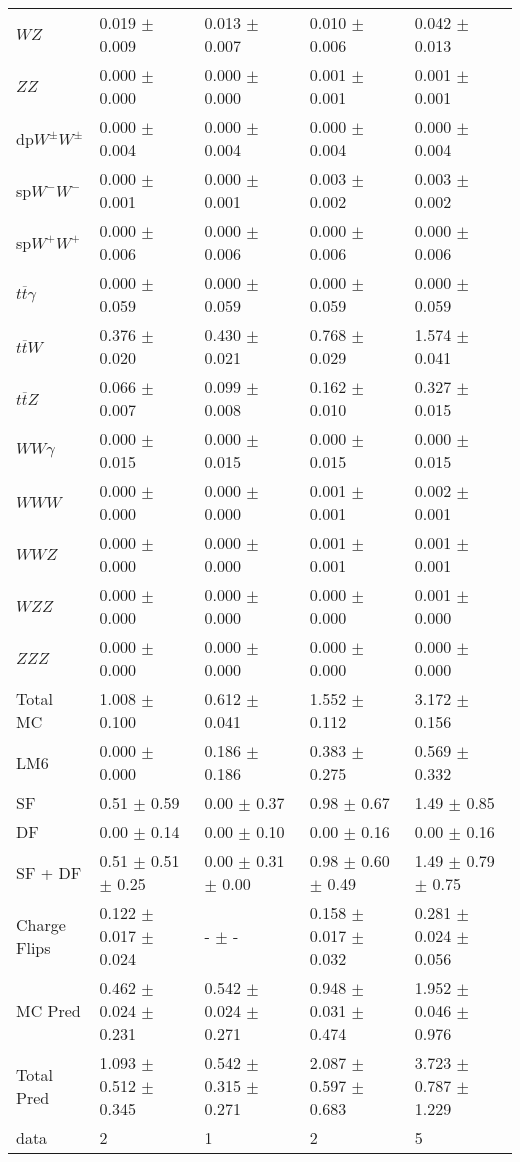 \begin{tabular}{l | l l l l}
$WZ$ &  0.019 $\pm$  0.009 &  0.013 $\pm$  0.007 &  0.010 $\pm$  0.006 &  0.042 $\pm$  0.013\\
$ZZ$ &  0.000 $\pm$   0.000 &  0.000 $\pm$   0.000 &  0.001 $\pm$  0.001 &  0.001 $\pm$  0.001\\
\hline
dp$W^{\pm}W^{\pm}$ &  0.000 $\pm$  0.004 &  0.000 $\pm$  0.004 &  0.000 $\pm$  0.004 &  0.000 $\pm$  0.004\\
sp$W^{-}W^{-}$ &  0.000 $\pm$  0.001 &  0.000 $\pm$  0.001 &  0.003 $\pm$  0.002 &  0.003 $\pm$  0.002\\
sp$W^{+}W^{+}$ &  0.000 $\pm$  0.006 &  0.000 $\pm$  0.006 &  0.000 $\pm$  0.006 &  0.000 $\pm$  0.006\\
$t\overline{t}\gamma$ &  0.000 $\pm$  0.059 &  0.000 $\pm$  0.059 &  0.000 $\pm$  0.059 &  0.000 $\pm$  0.059\\
$t\overline{t}W$ &  0.376 $\pm$  0.020 &  0.430 $\pm$  0.021 &  0.768 $\pm$  0.029 &  1.574 $\pm$  0.041\\
$t\overline{t}Z$ &  0.066 $\pm$  0.007 &  0.099 $\pm$  0.008 &  0.162 $\pm$  0.010 &  0.327 $\pm$  0.015\\
$WW\gamma$ &  0.000 $\pm$  0.015 &  0.000 $\pm$  0.015 &  0.000 $\pm$  0.015 &  0.000 $\pm$  0.015\\
$WWW$ &   0.000 $\pm$   0.000 &   0.000 $\pm$   0.000 &  0.001 $\pm$  0.001 &  0.002 $\pm$  0.001\\
$WWZ$ &  0.000 $\pm$   0.000 &  0.000 $\pm$   0.000 &  0.001 $\pm$  0.001 &  0.001 $\pm$  0.001\\
$WZZ$ &   0.000 $\pm$   0.000 &   0.000 $\pm$   0.000 &   0.000 $\pm$   0.000 &  0.001 $\pm$   0.000\\
$ZZZ$ &   0.000 $\pm$   0.000 &   0.000 $\pm$   0.000 &   0.000 $\pm$   0.000 &   0.000 $\pm$   0.000\\
\hline
Total MC &  1.008 $\pm$  0.100 &  0.612 $\pm$  0.041 &  1.552 $\pm$  0.112 &  3.172 $\pm$  0.156\\
\hline\hline
\hline
LM6 &  0.000 $\pm$  0.000 &  0.186 $\pm$  0.186 &  0.383 $\pm$  0.275 &  0.569 $\pm$  0.332\\
\hline\hline
\hline\hline
 SF  & 0.51 $\pm$ 0.59 & 0.00 $\pm$ 0.37 & 0.98 $\pm$ 0.67 & 1.49 $\pm$ 0.85\\
 DF  & 0.00 $\pm$ 0.14 & 0.00 $\pm$ 0.10 & 0.00 $\pm$ 0.16 & 0.00 $\pm$ 0.16\\
\hline
 SF + DF  & 0.51 $\pm$ 0.51 $\pm$ 0.25 & 0.00 $\pm$ 0.31 $\pm$ 0.00 & 0.98 $\pm$ 0.60 $\pm$ 0.49 & 1.49 $\pm$ 0.79 $\pm$ 0.75\\
\hline\hline
Charge Flips & 0.122 $\pm$ 0.017 $\pm$ 0.024 & - $\pm$ - & 0.158 $\pm$ 0.017 $\pm$ 0.032 & 0.281 $\pm$ 0.024 $\pm$ 0.056\\
\hline\hline
\hline
MC Pred &  0.462 $\pm$  0.024 $\pm$  0.231 &  0.542 $\pm$  0.024 $\pm$  0.271 &  0.948 $\pm$  0.031 $\pm$  0.474 &  1.952 $\pm$  0.046 $\pm$  0.976\\
\hline\hline
Total Pred &  1.093 $\pm$  0.512 $\pm$  0.345 &  0.542 $\pm$  0.315 $\pm$  0.271 &  2.087 $\pm$  0.597 $\pm$  0.683 &  3.723 $\pm$  0.787 $\pm$  1.229\\
\hline\hline
data & 2 & 1 & 2 & 5\\
\hline\hline
\end{tabular}
